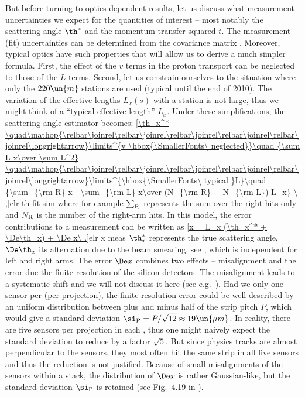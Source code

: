 But before turning to optics-dependent results, let us discuss what measurement uncertainties we expect for the quantities of interest -- most notably the scattering angle $\th^*$ and the momentum-transfer squared $t$. The measurement (fit) uncertainties can be determined from the covariance matrix . Moreover, typical  optics
have such properties that will allow us to derive a much simpler formula. First, the effect of the $v$ terms in the proton transport  can be neglected to those of the $L$ terms. Second, let us constrain ourselves to the situation where only the $220\un{m}$ stations are used (typical until the end of 2010). The variation of the effective lengths $L_x(s)$ with a station is not large, thus we might think of a ``typical effective length'' $L_x$. Under these simplifications, the scattering angle estimator becomes:
\eqref{\th_x^*
	\quad\mathop{\relbar\joinrel\relbar\joinrel\relbar\joinrel\relbar\joinrel\relbar\joinrel\longrightarrow}\limits^{v \hbox{\SmallerFonts\ neglected}}\quad
		{\sum L x\over \sum L^2}
	\quad\mathop{\relbar\joinrel\relbar\joinrel\relbar\joinrel\relbar\joinrel\relbar\joinrel\longrightarrow}\limits^{\hbox{\SmallerFonts\ typical }L}\quad
	{\sum_{\rm R} x - \sum_{\rm L} x\over (N_{\rm R} + N_{\rm L}) L_x}
\ ,}{elr th fit sim} 
where for example $\sum_{\rm R}$ represents the sum over the right hits only and $N_{\rm R}$ is the number of the right-arm hits. In this model, the error contributions to a measurement can be written as
\eqref{x = L_x (\th_x^* + \De\th_x) + \De x\ .}{elr x meas}
$\th_x^*$ represents the true scattering angle, $\De\th_x$ its alternation due to the beam smearing, see , which is independent for left and right arms. The error $\De x$ combines two effects -- misalignment and the error due the finite resolution of the silicon detectors. The misalignment leads to a systematic shift and we will not discuss it here (see e.g.~). Had we only one sensor per  (per projection), the finite-resolution error could be well described by an uniform distribution between plus and minus half of the strip pitch $P$, which would give a standard deviation $\si_{\rm P} = P/\sqrt{12}\approx 19\un{\mu m}$. In reality, there are five sensors per projection in each , thus one might naively expect the standard deviation to reduce by a factor $\sqrt 5$. But since physics tracks are almost perpendicular to the sensors, they most often hit the same strip in all five sensors and thus the reduction is not justified. Because of small misalignments of the sensors within a stack, the distribution of $\De x$ is rather Gaussian-like, but the standard deviation $\si_{\rm P}$ is retained (see Fig.~4.19 in ).

